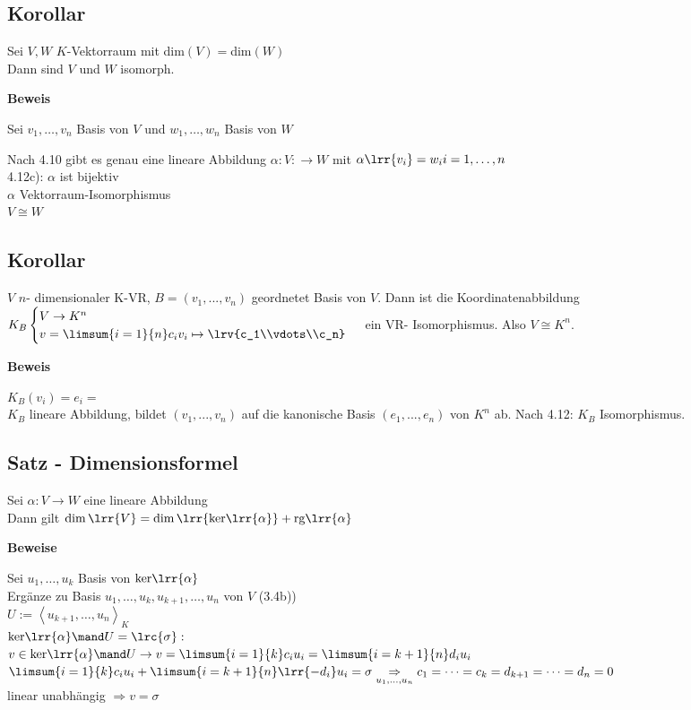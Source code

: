 \subsection{Korollar}
	Sei $V,W$ $K$-Vektorraum mit dim$(V)=$dim$(W)$\\
	Dann sind $V$ und $W$ isomorph.
	
	\textbf{Beweis}
	
	Sei $v_1,\dots,v_n$ Basis von $V$ und $w_1,\dots,w_n$ Basis von $W$
	
	Nach 4.10 gibt es genau eine lineare Abbildung $\alpha:V:\rightarrow W$ mit $\alpha\lrr{v_i}=w_i i=1,\dots,n$\\
	4.12c): $\alpha$ ist bijektiv\\
	$\alpha$ Vektorraum-Isomorphismus\\
	$V\cong W$

\subsection{Korollar}
  $V$ $n$- dimensionaler K-VR, $B=(v_1,...,v_n)$ geordnetet Basis von $V$. Dann
ist die Koordinatenabbildung $K_B\begin{cases}V\rightarrow
K^n\\v=\limsum{i=1}{n}c_iv_i\mapsto\lrv{c_1\\vdots\\c_n}\end{cases}$ ein VR-
Isomorphismus. Also $V\cong K^n$.

  \textbf{Beweis}
  
  $K_B(v_i)=e_i=$\\
  $K_B$ lineare Abbildung, bildet $(v_1,...,v_n)$ auf die kanonische Basis
  $(e_1,...,e_n)$ von $K^n$ ab. Nach 4.12: $K_B$ Isomorphismus.

\subsection{Satz - Dimensionsformel}
	Sei $\alpha:V\rightarrow W$ eine lineare Abbildung\\
	Dann gilt $\dim\lrr{V}=\dim\lrr{\mbox{ker}\lrr{\alpha}}+\mbox{rg}\lrr{\alpha}$
	
	\textbf{Beweise}
	
	Sei $u_1,\dots,u_k$ Basis von $\mbox{ker}\lrr{\alpha}$\\
	Ergänze zu Basis $u_1,\dots,u_k,u_{k+1},\dots,u_n$ von $V$ (3.4b))\\
	$U:=\left\langle u_{k+1},\dots,u_n\right\rangle_K$\\
	$\mbox{ker}\lrr{\alpha}\mand U=\lrc{\sigma}:$\\
	$v\in\mbox{ker}\lrr{\alpha}\mand U\rightarrow v=\limsum{i=1}{k}c_iu_i=\limsum{i=k+1}{n}d_iu_i$\\
	$\limsum{i=1}{k}c_iu_i+\limsum{i=k+1}{n}\lrr{-d_i}u_i=\sigma\underset{\scriptstyle u_1,\dots,u_n}{\Rightarrow} c_1=\dots=c_k=d_{k+1}=\dots=d_n=0$\\
	linear unabhängig $\Rightarrow v=\sigma$
	
